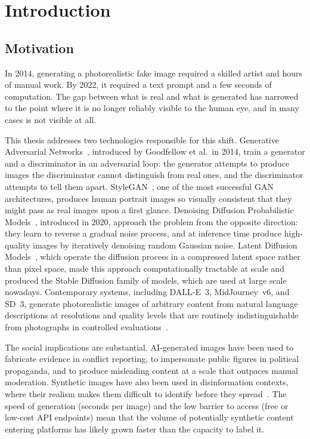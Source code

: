 \chapter{Introduction}
\label{ch:introduction}


\section{Motivation}
\label{sec:motivation}

In 2014, generating a photorealistic fake image required a skilled artist and hours of
manual work. By 2022, it required a text prompt and a few seconds of computation. The
gap between what is real and what is generated has narrowed to the point where it is no
longer reliably visible to the human eye, and in many cases is not visible at all.

This thesis addresses two technologies responsible for this shift. Generative
Adversarial Networks~\cite{goodfellow2014}, introduced by Goodfellow et al.\ in 2014,
train a generator and a discriminator in an adversarial loop: the generator attempts to
produce images the discriminator cannot distinguish from real ones, and the discriminator
attempts to tell them apart. StyleGAN~\cite{karras2019}, one of the most successful GAN
architectures, produces human portrait images so visually consistent that they might pass
as real images upon a first glance. Denoising Diffusion Probabilistic Models~\cite{ho2020}, introduced in 2020, approach the
problem from the opposite direction: they learn to reverse a gradual noise process, and
at inference time produce high-quality images by iteratively denoising random Gaussian
noise. Latent Diffusion Models~\cite{rombach2022}, which operate the diffusion process in
a compressed latent space rather than pixel space, made this approach computationally
tractable at scale and produced the Stable Diffusion family of models, which are used at
large scale nowadays. Contemporary systems, including DALL-E~3, MidJourney~v6, and
SD~3, generate photorealistic images of arbitrary content from natural language
descriptions at resolutions and quality levels that are routinely indistinguishable from
photographs in controlled evaluations~\cite{nightingale2022ai}.

The social implications are substantial. AI-generated images have been used to fabricate
evidence in conflict reporting, to impersonate public figures in political propaganda, and
to produce misleading content at a scale that outpaces manual moderation. Synthetic images have also been used in disinformation contexts, where their
realism makes them difficult to identify before they spread~\cite{nightingale2022ai}. The speed of generation (seconds per image) and the
low barrier to access (free or low-cost API endpoints) mean that the volume of potentially
synthetic content entering platforms has likely grown faster than the capacity to label it.

